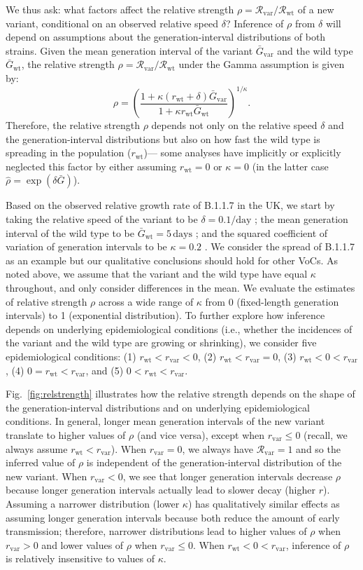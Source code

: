 \documentclass[12pt]{article}
\newcommand{\fref}[1]{Fig.~\ref{fig:#1}}
\newcommand{\vvvar}{\mathrm{var}}
\newcommand{\wwwt}{\mathrm{wt}}
\newcommand{\rx}[1]{\ensuremath{{r}_{#1}}\xspace}
\newcommand{\rw}{\rx{\wwwt}}
\newcommand{\rv}{\rx{\vvvar}}
\newcommand{\Rx}[1]{\ensuremath{{\mathcal R}_{#1}}\xspace}
\newcommand{\Rw}{\Rx{\wwwt}}
\newcommand{\Rv}{\Rx{\vvvar}}
\newcommand{\days}{\ensuremath{\, \textrm{days}}}
\newcommand{\pday}{\ensuremath{/\textrm{day}}}
\newcommand{\Gx}[1]{\ensuremath{{\bar G}_{#1}}\xspace}
\newcommand{\Gw}{\Gx{\wwwt}}
\newcommand{\Gv}{\Gx{\vvvar}}
\begin{document}
We thus ask: what factors affect the relative strength $\rho = \Rv/\Rw$ of a new variant, conditional on an observed relative speed $\delta$?
Inference of $\rho$ from $\delta$ will depend on assumptions about the generation-interval distributions of both strains.
Given the mean generation interval of the variant $\Gv$ and the wild type $\Gw$, the relative strength $\rho = \Rv/\Rw$ under the Gamma assumption \citep{park2019practical} is given by:
\begin{equation}
\rho = \left(\frac{1 + \kappa (\rw + \delta) \Gv}{1 + \kappa \rw \Gw}\right)^{1/\kappa}.
\end{equation}
Therefore, the relative strength $\rho$ depends not only on the relative speed $\delta$ and the generation-interval distributions but also on how fast the wild type is spreading in the population (\rw)---
some analyses have implicitly or explicitly neglected this factor by either assuming $\rw = 0$ \citep{switzerland2021variant} or $\kappa = 0$ \citep{davies2021estimated} (in the latter case $\hat{\rho} = \exp(\delta \bar{G})$).

Based on the observed relative growth rate of B.1.1.7 in the UK, we start by  taking the relative speed of the variant to be $\delta = 0.1\pday$  \citep{davies2021estimated}; the mean generation interval of the wild type to be $\Gw = 5\days$ \citep{ferretti2020quantifying}; and the squared coefficient of variation of generation intervals to be $\kappa=0.2$ \citep{ferretti2020quantifying}.
We consider the spread of B.1.1.7 as an example but our qualitative conclusions should hold for other VoCs.
As noted above, we assume that the variant and the wild type have equal $\kappa$ throughout, and only consider differences in the mean.
We evaluate the estimates of relative strength $\rho$ across a wide range of $\kappa$ from 0 (fixed-length generation intervals) to 1 (exponential distribution).
To further explore how inference depends on underlying epidemiological conditions (i.e., whether the incidences of the variant and the wild type are growing or shrinking), we consider five epidemiological conditions: (1) $\rw < \rv < 0$, (2) $\rw < \rv = 0$, (3) $\rw < 0 < \rv$, (4) $0 = \rw < \rv$, and (5) $0 < \rw < \rv$.

\fref{relstrength} illustrates how the relative strength depends on the shape of the generation-interval distributions and on underlying epidemiological conditions.
In general, longer mean generation intervals of the new variant translate to higher values of $\rho$ (and vice versa), except when $\rv \leq 0$ (recall, we always assume $\rw<\rv$).
When $\rv = 0$, we always have $\Rv = 1$ and so the inferred value of $\rho$ is independent of the generation-interval distribution of the new variant.
When $\rv < 0$, we see that longer generation intervals decrease $\rho$ because longer generation intervals actually lead to slower decay (higher $r$).
Assuming a narrower distribution (lower $\kappa$) has qualitatively similar effects as assuming longer generation intervals because both reduce the amount of early transmission; 
therefore, narrower distributions lead to higher values of $\rho$ when $\rv > 0$ and lower values of $\rho$ when $\rv \leq 0$.
When $\rw < 0 < \rv$, inference of $\rho$ is relatively insensitive to values of $\kappa$.
\end{document}
